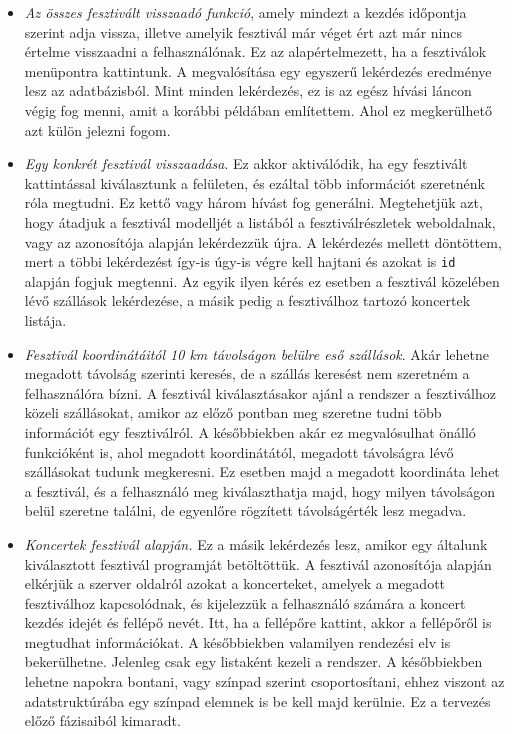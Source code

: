 \begin{itemize}
\item \textit{Az összes fesztivált visszaadó funkció}, amely mindezt a kezdés időpontja szerint adja vissza, illetve amelyik fesztivál már véget ért azt már nincs értelme visszaadni a felhasználónak. Ez az alapértelmezett, ha a fesztiválok menüpontra kattintunk. A megvalósítása egy egyszerű lekérdezés eredménye lesz az adatbázisból. Mint minden lekérdezés, ez is az egész hívási láncon végig fog menni, amit a korábbi példában említettem. Ahol ez megkerülhető azt külön jelezni fogom.
 
\item \textit{Egy konkrét fesztivál visszaadása}. Ez akkor aktiválódik, ha egy fesztivált kattintással kiválasztunk a felületen, és ezáltal több információt szeretnénk róla megtudni. Ez kettő vagy három hívást fog generálni. Megtehetjük azt, hogy átadjuk a fesztivál modelljét a listából a fesztiválrészletek weboldalnak, vagy az azonosítója alapján lekérdezzük újra. A lekérdezés mellett döntöttem, mert a többi lekérdezést így-is úgy-is végre kell hajtani és azokat is \texttt{id} alapján fogjuk megtenni. Az egyik ilyen kérés ez esetben a fesztivál közelében lévő szállások lekérdezése, a másik pedig a fesztiválhoz tartozó koncertek listája.   

\item \textit{Fesztivál koordinátáitól 10 km távolságon belülre eső szállások}. Akár lehetne megadott távolság szerinti keresés, de a szállás keresést nem szeretném a felhasználóra bízni. A fesztivál kiválasztásakor ajánl a rendszer a fesztiválhoz közeli szállásokat, amikor az előző pontban meg szeretne tudni több információt egy fesztiválról. A későbbiekben akár ez megvalósulhat önálló funkcióként is, ahol megadott koordinátától, megadott távolságra lévő szállásokat tudunk megkeresni. Ez esetben majd a megadott koordináta lehet a fesztivál, és a felhasználó meg kiválaszthatja majd, hogy milyen távolságon belül szeretne találni, de egyenlőre rögzített távolságérték lesz megadva.

\item \textit{Koncertek fesztivál alapján.} Ez a másik lekérdezés lesz, amikor egy általunk kiválasztott fesztivál programját betöltöttük. A fesztivál azonosítója alapján elkérjük a szerver oldalról azokat a koncerteket, amelyek a megadott fesztiválhoz kapcsolódnak, és kijelezzük a felhasználó számára a koncert kezdés idejét és fellépő nevét. Itt, ha a fellépőre kattint, akkor a fellépőről is megtudhat információkat. A későbbiekben valamilyen rendezési elv is bekerülhetne. Jelenleg csak egy listaként kezeli a rendszer. A későbbiekben lehetne napokra bontani, vagy színpad szerint csoportosítani, ehhez viszont az adatstruktúrába egy színpad elemnek is be kell majd kerülnie. Ez a tervezés előző fázisaiból kimaradt.


\end{itemize}
